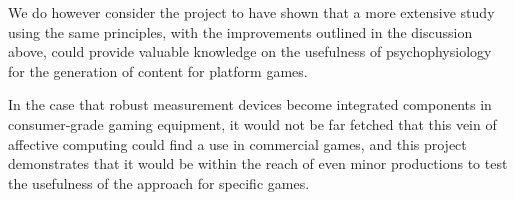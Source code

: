 \documentclass{llncs}
\begin{document}
We do however consider the project to have shown that a more extensive study using the same principles, with the improvements outlined in the discussion above, could provide valuable knowledge on the usefulness of psychophysiology for the generation of content for platform games.

In the case that robust measurement devices become integrated components in consumer-grade gaming equipment, it would not be far fetched that this vein of affective computing could find a use in commercial games, and this project demonstrates that it would be within the reach of even minor productions to test the usefulness of the approach for specific games.


\end{document}

